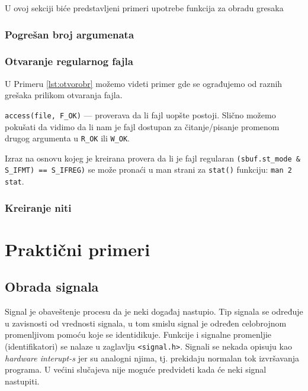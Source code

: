 \documentclass[a4paper, 11pt, twoside]{article}
\newcommand{\scode}[3] {
	\hspace{.06\textwidth} 
	\begin{minipage}[t]{.88\textwidth} %
		\begin{mdframed}[topline=true,bottomline=true,leftline=true,rightline=true,backgroundcolor=gray!22, linecolor=gray!60!black,roundcorner=1mm]
			 

	\begin{center}
		\caption{\textbf{Primer \ref{lst:#3}:} #2}
	\end{center}
	\end{mdframed}
	\end{minipage}

}
\begin{document}
U ovoj sekciji biće predstavljeni primeri upotrebe funkcija za obradu gresaka

\subsubsection{Pogrešan broj argumenata}

\scode{wnarg.c}{Pogresan broj argumenata}{wnarg}

\subsubsection{Otvaranje regularnog fajla}

U Primeru \ref{lst:otvorobr} možemo videti primer gde se ograđujemo od raznih grešaka prilikom otvaranja fajla.

\scode{openerchk.c}{Otvaranje regularnog fajla}{otvorobr}
\vspace{2mm} 

\texttt{access(file, F\_OK)} --- proverava da li fajl uopšte postoji. Slično možemo pokušati da vidimo da li nam je fajl dostupan za čitanje/pisanje promenom drugog argumenta u \texttt{R\_OK} ili \texttt{W\_OK}.

Izraz na osnovu kojeg je kreirana provera da li je fajl regularan \texttt{(sbuf.st\_mode \& S\_IFMT) == S\_IFREG)} se može pronaći u man strani za \texttt{stat()} funkciju: \texttt{man 2 stat}.

\subsubsection{Kreiranje niti}

\scode{pthcrer.c}{Obrada greske za funkcije koje rade sa threadovima}{pthcrer}


 

\newpage

\section{Praktični primeri}

\subsection{Obrada signala}

Signal je obaveštenje procesu da je neki događaj nastupio. Tip signala se određuje u zavisnosti od vrednosti signala, u tom smislu signal je određen celobrojnom promenljivom pomoću koje se identidikuje. Funkcije i signalne promenljie (identifikatori) se nalaze u zaglavlju \texttt{<signal.h>}. Signali se nekada opisuju kao \emph{hardware interupt-s} jer su analogni njima, tj. prekidaju normalan tok izvršavanja programa. U većini slučajeva nije moguće predvideti kada će neki signal nastupiti.
\end{document}
